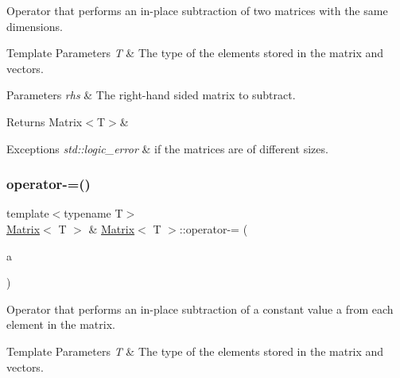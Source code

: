 Operator that performs an in-\/place subtraction of two matrices with the same dimensions. 


\begin{DoxyTemplParams}{Template Parameters}
{\em T} & The type of the elements stored in the matrix and vectors. \\
\hline
\end{DoxyTemplParams}

\begin{DoxyParams}{Parameters}
{\em rhs} & The right-\/hand sided matrix to subtract. \\
\hline
\end{DoxyParams}
\begin{DoxyReturn}{Returns}
Matrix$<$\+T$>$\&
\end{DoxyReturn}

\begin{DoxyExceptions}{Exceptions}
{\em std\+::logic\+\_\+error} & if the matrices are of different sizes. \\
\hline
\end{DoxyExceptions}
\mbox{\label{classMatrix_a8776d41fcbbc1fc08425492576cf6786}} 
\subsubsection{\texorpdfstring{operator-\/=()}{operator-=()}\hspace{0.1cm}{\footnotesize\ttfamily [2/2]}}
{\footnotesize\ttfamily template$<$typename T$>$ \\
\mbox{\hyperlink{classMatrix}{Matrix}}$<$ T $>$ \& \mbox{\hyperlink{classMatrix}{Matrix}}$<$ T $>$\+::operator-\/= (\begin{DoxyParamCaption}\item[{const T \&}]{a }\end{DoxyParamCaption})\hspace{0.3cm}{\ttfamily [inline]}}



Operator that performs an in-\/place subtraction of a constant value {\ttfamily a} from each element in the matrix. 


\begin{DoxyTemplParams}{Template Parameters}
{\em T} & The type of the elements stored in the matrix and vectors. \\
\hline
\end{DoxyTemplParams}

